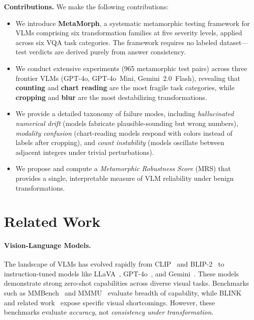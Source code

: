 \documentclass[10pt,twocolumn,letterpaper]{article}
\begin{document}
\textbf{Contributions.} We make the following contributions:
\begin{itemize}
    \item We introduce \textbf{MetaMorph}, a systematic metamorphic testing framework for VLMs comprising six transformation families at five severity levels, applied across six VQA task categories. The framework requires no labeled dataset---test verdicts are derived purely from answer consistency.
    \item We conduct extensive experiments (965 metamorphic test pairs) across three frontier VLMs (GPT-4o, GPT-4o~Mini, Gemini~2.0~Flash), revealing that \textbf{counting} and \textbf{chart reading} are the most fragile task categories, while \textbf{cropping} and \textbf{blur} are the most destabilizing transformations.
    \item We provide a detailed taxonomy of failure modes, including \emph{hallucinated numerical drift} (models fabricate plausible-sounding but wrong numbers), \emph{modality confusion} (chart-reading models respond with colors instead of labels after cropping), and \emph{count instability} (models oscillate between adjacent integers under trivial perturbations).
    \item We propose and compute a \emph{Metamorphic Robustness Score} (MRS) that provides a single, interpretable measure of VLM reliability under benign transformations.
\end{itemize}

\section{Related Work}
\label{sec:related}

\paragraph{Vision-Language Models.}
The landscape of VLMs has evolved rapidly from CLIP~\cite{radford2021learning} and BLIP-2~\cite{li2023blip2} to instruction-tuned models like LLaVA~\cite{liu2024visual}, GPT-4o~\cite{openai2024gpt4o}, and Gemini~\cite{team2024gemini}. These models demonstrate strong zero-shot capabilities across diverse visual tasks. Benchmarks such as MMBench~\cite{liu2023mmbench} and MMMU~\cite{yue2024mmmu} evaluate breadth of capability, while BLINK~\cite{fu2024blink} and related work~\cite{tong2024eyes,rahmanzadehgervi2024vision} expose specific visual shortcomings. However, these benchmarks evaluate \emph{accuracy}, not \emph{consistency under transformation}.
\end{document}
